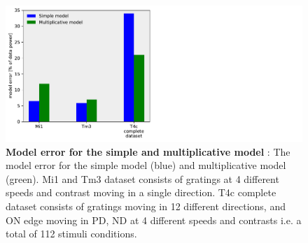 \documentclass[9pt,lineno]{elife}
\begin{document}
\begin{figure}
\begin{fullwidth}
\hspace*{2cm}\includegraphics[width=0.84\linewidth]{figure9}
\caption{\textbf{Model error for the simple and multiplicative model} : The model error for the simple model (blue) and multiplicative model (green). Mi1 and Tm3 dataset consists of gratings at 4 different speeds and contrast moving in a single direction. T4c complete dataset consists of gratings moving in 12 different directions, and ON edge moving in PD, ND at 4 different speeds and contrasts i.e. a total of 112 stimuli conditions.}

\label{FitError}
	
\end{fullwidth}
\end{figure} 
\end{document}
